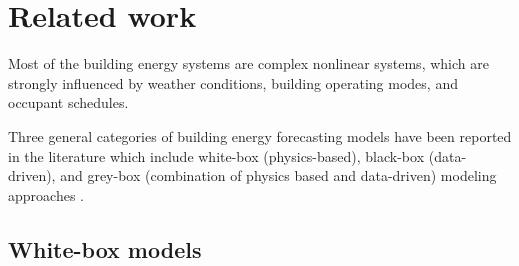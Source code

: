 \documentclass[10pt, conference, compsocconf]{IEEEtran}
\begin{document}








\section{Related work}

Most of the building energy systems are complex nonlinear systems, which are strongly influenced by weather conditions, building operating modes, and occupant schedules.

Three general categories of building energy forecasting models have been reported in the literature which include white-box (physics-based), black-box (data-driven), and grey-box (combination of physics based and data-driven) modeling approaches \cite{li2014review}.

\subsection{White-box models}
\end{document}
